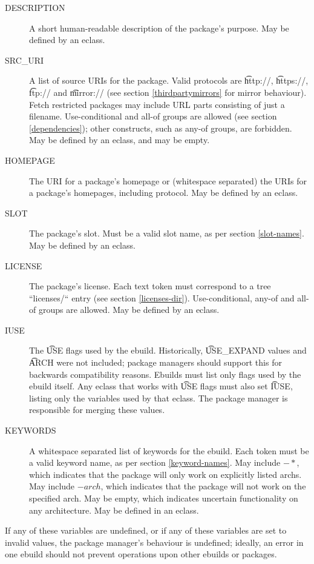 \begin{description}
\item[DESCRIPTION] A short human-readable description of the package's purpose. May be defined by an
    eclass.
\item[SRC\_URI] A list of source URIs for the package. Valid protocols are \t{http://},
    \t{https://}, \t{ftp://} and \t{mirror://} (see section \ref{thirdpartymirrors} for mirror behaviour).
    Fetch restricted packages may include URL parts consisting of just a filename.  Use-conditional and
    all-of groups are allowed (see section \ref{dependencies}); other constructs,
    such as any-of groups, are forbidden. May be defined by an eclass, and may be empty.
\item[HOMEPAGE] The URI for a package's homepage or (whitespace separated) the URIs for a package's
    homepages, including protocol. May be defined by an eclass.
\item[SLOT] The package's slot. Must be a valid slot name, as per section \ref{slot-names}. May
    be defined by an eclass.
\item[LICENSE] The package's license. Each text token must correspond to a tree ``licenses/`` entry
    (see section \ref{licenses-dir}). Use-conditional, any-of and all-of groups are allowed.
    May be defined by an eclass. \label{ebuild-var-LICENSE}
\item[IUSE] The \t{USE} flags used by the ebuild. Historically, \t{USE\_EXPAND} values and \t{ARCH}
    were not included; package managers should support this for backwards compatibility reasons. Ebuilds
    must list only flags used by the ebuild itself. Any eclass that works with \t{USE} flags
    must also set \t{IUSE}, listing only the variables used by that eclass. The package manager is
    responsible for merging these values.
\item[KEYWORDS] A whitespace separated list of keywords for the ebuild. Each token must be a
    valid keyword name, as per section \ref{keyword-names}. May include $-*$, which
    indicates that the package will only work on explicitly listed archs. May include $-arch$,
    which indicates that the package will not work on the specified arch. May be empty, which
    indicates uncertain functionality on any architecture. May be defined in an eclass.
\end{description}

If any of these variables are undefined, or if any of these variables are set to invalid values,
the package manager's behaviour is undefined; ideally, an error in one ebuild should not prevent
operations upon other ebuilds or packages.

